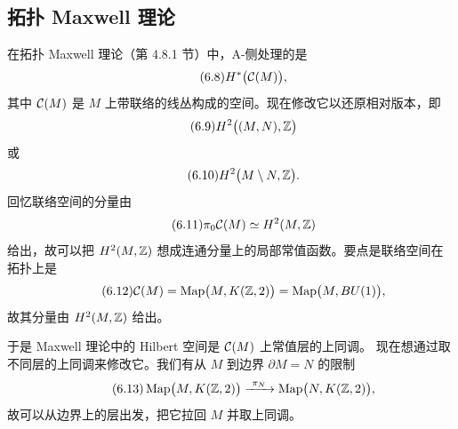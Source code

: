 \subsection{拓扑 Maxwell 理论}

在拓扑 Maxwell 理论（第 4.8.1 节）中，A-侧处理的是
\begin{equation}\tag{6.8}\label{eq:6.8}
H^*\bigl(\mathcal{C}(M)\bigr),
\end{equation}
其中 $\mathcal{C}(M)$ 是 $M$ 上带联络的线丛构成的空间。现在修改它以还原相对版本，即
\begin{equation}\tag{6.9}\label{eq:6.9}
H^2\bigl((M,N),\mathbb{Z}\bigr)
\end{equation}
或
\begin{equation}\tag{6.10}\label{eq:6.10}
H^2\bigl(M\setminus N,\mathbb{Z}\bigr).
\end{equation}
回忆联络空间的分量由
\begin{equation}\tag{6.11}\label{eq:6.11}
\pi_0\mathcal{C}(M)\simeq H^2(M,\mathbb{Z})
\end{equation}
给出，故可以把 $H^2(M,\mathbb{Z})$ 想成连通分量上的局部常值函数。要点是联络空间在拓扑上是
\begin{equation}\tag{6.12}\label{eq:6.12}
\mathcal{C}(M)=\operatorname{Map}\bigl(M,K(\mathbb{Z},2)\bigr)=\operatorname{Map}\bigl(M,BU(1)\bigr),
\end{equation}
故其分量由 $H^2(M,\mathbb{Z})$ 给出。

于是 Maxwell 理论中的 Hilbert 空间是 $\mathcal{C}(M)$ 上常值层的上同调。
现在想通过取不同层的上同调来修改它。我们有从 $M$ 到边界 $\partial M=N$ 的限制
\begin{equation}\tag{6.13}\label{eq:6.13}
\operatorname{Map}\bigl(M,K(\Z,2)\bigr)\xrightarrow{\ \pi_N\ }\operatorname{Map}\bigl(N,K(\Z,2)\bigr),
\end{equation}
故可以从边界上的层出发，把它拉回 $M$ 并取上同调。

